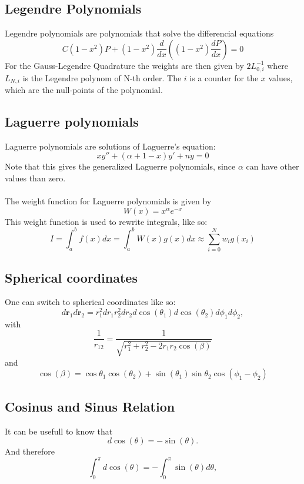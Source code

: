 \documentclass{emulateapj}
\begin{document}
	\subsection{Legendre Polynomials} \label{sec:leg}
	Legendre polynomials are polynomials that solve the differencial equations
	\begin{equation*}
	C (1 - x^2) P + (1 - x^2) \frac{d}{dx} \left( (1 - x^2) \frac{dP}{dx} \right) = 0
	\end{equation*}
	For the Gauss-Legendre Quadrature the weights are then given by $2 L^{-1}_{0, i}$ where $L_{N, i}$ is the Legendre polynom of N-th order. The $i$ is a counter for the $x$ values, which are the null-points of the polynomial.
	
	\subsection{Laguerre polynomials} \label{sub:lag} 
	Laguerre polynomials are solutions of Laguerre's equation:
	$$
	xy''+(\alpha+1-x)y'+ny=0
	$$
	Note that this gives the generalized Laguerre polynomials, since $\alpha$ can have other values than zero. \\ \\
	The weight function for Laguerre polynomials is given by 
	\begin{equation} \label{eq:2}
	W(x)=x^{\alpha}e^{-x}
	\end{equation}
	This weight function is used to rewrite integrals, like so:
	\begin{equation} \label{eq:3}
	I=\int_a^b f(x) dx = \int_a^b W(x) g(x) dx \approx \sum_{i=0}^N w_i g(x_i)
	\end{equation}
	
	\subsection{Spherical coordinates} \label{sub:spher}
	One can switch to spherical coordinates like so:
	$$
	d\textbf{r}_1 d\textbf{r}_2 = r_1^2dr_1r_2^2dr_2d\cos(\theta_1)d\cos(\theta_2)d\phi_1d\phi_2,
	$$
	with
	$$
	\frac{1}{r_{12}}=\frac{1}{\sqrt{r_1^2+r_2^2-2r_1r_2\cos(\beta)}}
	$$
	and
	$$
	\cos(\beta)=\cos{\theta_1}\cos(\theta_2)+\sin(\theta_1)\sin{\theta_2}\cos(\phi_1-\phi_2)
	$$
	
	\subsection{Cosinus and Sinus Relation} \label{sub:cossin}
	It can be usefull to know that
	$$
	d\cos(\theta) = -\sin(\theta).
	$$
	And therefore
	$$
	\int_0^{\pi}d\cos(\theta) = -\int_0^{\pi}\sin(\theta)d\theta,
	$$
\end{document}
